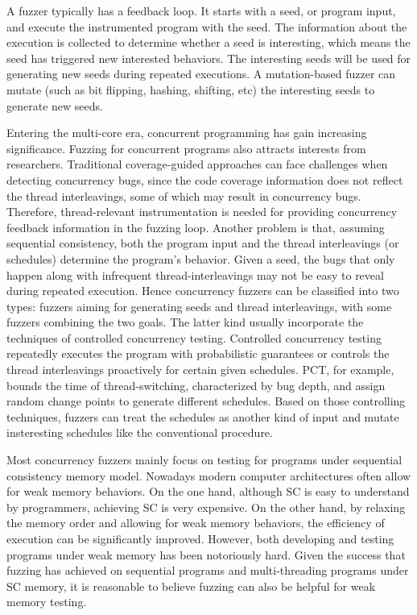 A fuzzer typically has a feedback loop. It starts with a seed, or program input, and execute the instrumented program with the seed. The information about the execution is collected to determine whether a seed is interesting, which means the seed has triggered new interested behaviors. The interesting seeds will be used for generating new seeds during repeated executions. A mutation-based fuzzer can mutate (such as bit flipping, hashing, shifting, etc) the interesting seeds to generate new seeds. 


Entering the multi-core era, concurrent programming has gain increasing significance. Fuzzing for concurrent programs also attracts interests from researchers. Traditional coverage-guided approaches can face challenges when detecting concurrency bugs, since the code coverage information does not reflect the thread interleavings, some of which may result in concurrency bugs. Therefore, thread-relevant instrumentation is needed for providing concurrency feedback information in the fuzzing loop. Another problem is that, assuming sequential consistency, both the program input and the thread interleavings (or schedules) determine the program's behavior. Given a seed, the bugs that only happen along with infrequent thread-interleavings may not be easy to reveal during repeated execution. Hence concurrency fuzzers can be classified into two types: fuzzers aiming for generating seeds and thread interleavings, with some fuzzers combining the two goals. The latter kind usually incorporate the techniques of controlled concurrency testing. Controlled concurrency testing repeatedly executes the program with probabilistic guarantees or controls the thread interleavings proactively for certain given schedules. PCT, for example, bounds the time of thread-switching, characterized by bug depth, and assign random change points to generate different schedules. Based on those controlling techniques, fuzzers can treat the schedules as another kind of input and mutate insteresting schedules like the conventional procedure. 


Most concurrency fuzzers mainly focus on testing for programs under sequential consistency memory model. Nowadays modern computer architectures often allow for weak memory behaviors. On the one hand, although SC is easy to understand by programmers, achieving SC is very expensive. On the other hand, by relaxing the memory order and allowing for weak memory behaviors, the efficiency of execution can be significantly improved. However, both developing and testing programs under weak memory has been notoriously hard. Given the success that fuzzing has achieved on sequential programs and multi-threading programs under SC memory, it is reasonable to believe fuzzing can also be helpful for weak memory testing. 
















